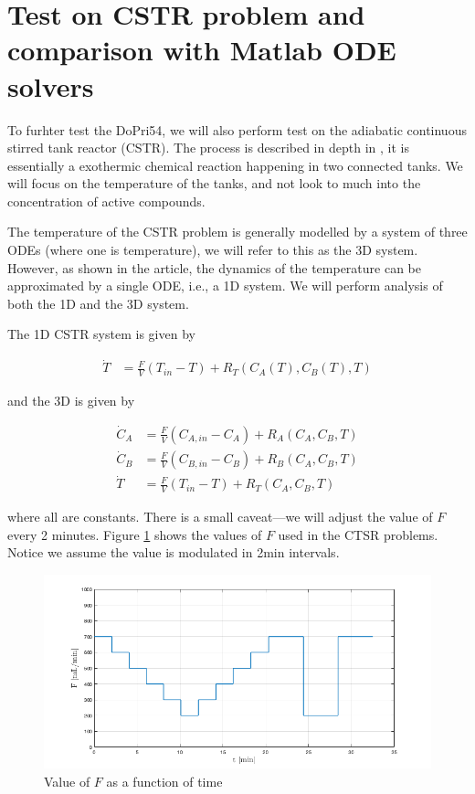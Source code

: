  
\section{Test on CSTR problem and comparison with Matlab ODE solvers}
To furhter test the DoPri54, we will also perform test on the adiabatic continuous stirred tank reactor (CSTR). The process is described in depth in \cite{cstr}, it is essentially a exothermic chemical reaction happening in two connected tanks. We will focus on the temperature of the tanks, and not look to much into the concentration of active compounds. 

The temperature of the CSTR problem is generally modelled by a system of three ODEs (where one is temperature), we will refer to this as the 3D system. However, as shown in the article, the dynamics of the temperature can be approximated by a single ODE, i.e., a 1D system. We will perform analysis of both the 1D and the 3D system.

The 1D CSTR system is given by

\begin{align}
    \dot T &=  \frac{F}{V} (T_{in} − T)+R_T (C_A(T),C_B(T),T)
\end{align}

and the 3D is given by

\begin{align}
\dot{C}_{A} &=\frac{F}{V}\left(C_{A, i n}-C_{A}\right)+R_{A}\left(C_{A}, C_{B}, T\right) \\
\dot{C}_{B} &=\frac{F}{V}\left(C_{B, i n}-C_{B}\right)+R_{B}\left(C_{A}, C_{B}, T\right) \\
\dot{T} &=\frac{F}{V}\left(T_{i n}-T\right)+R_{T}\left(C_{A}, C_{B}, T\right)
\end{align}

where all are constants. There is a small caveat---we will adjust the value of $F$ every 2 minutes. Figure \ref{fig6:f-val} shows the values of $F$ used in the CTSR problems. Notice we assume the value is modulated in 2min intervals. 

\begin{figure}[H]
    \centering
    \includegraphics[width=\textwidth]{graphics/opg6/f-val.png}
    \caption{Value of $F$ as a function of time}
    \label{fig6:f-val}
\end{figure}

